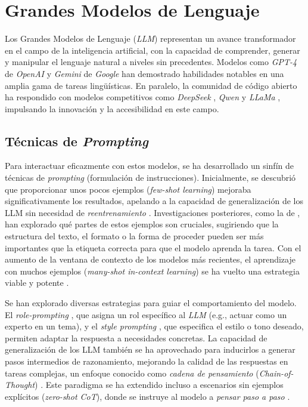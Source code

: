\section{Grandes Modelos de Lenguaje}
\label{sec:llm}
Los Grandes Modelos de Lenguaje (\textit{LLM}) representan un avance transformador en el campo de la inteligencia artificial, con la capacidad de comprender, generar y manipular el lenguaje natural a niveles sin precedentes. Modelos como \textit{GPT-4} de \textit{OpenAI} \parencite{openaiGPT4TechnicalReport2024} y \textit{Gemini} de \textit{Google} \parencite{teamGeminiFamilyHighly2024} han demostrado habilidades notables en una amplia gama de tareas lingüísticas. En paralelo, la comunidad de código abierto ha respondido con modelos competitivos como \textit{DeepSeek} \parencite{deepseek-aiDeepSeekV3TechnicalReport2024}, \textit{Qwen} \parencite{baiQwenTechnicalReport2023} y \textit{LLaMa} \parencite{grattafioriLlama3Herd2024}, impulsando la innovación y la accesibilidad en este campo.

\subsection{Técnicas de \textit{Prompting}}
\label{subsec:prompting_techniques}
Para interactuar eficazmente con estos modelos, se ha desarrollado un sinfín de técnicas de \textit{prompting} (formulación de instrucciones). Inicialmente, se descubrió que proporcionar unos pocos ejemplos (\textit{few-shot learning}) mejoraba significativamente los resultados, apelando a la capacidad de generalización de los LLM sin necesidad de \textit{reentrenamiento} \parencite{brownLanguageModelsAre2020}. Investigaciones posteriores, como la de \cite{minRethinkingRoleDemonstrations2022}, han explorado qué partes de estos ejemplos son cruciales, sugiriendo que la estructura del texto, el formato o la forma de proceder pueden ser más importantes que la etiqueta correcta para que el modelo aprenda la tarea. Con el aumento de la ventana de contexto de los modelos más recientes, el aprendizaje con muchos ejemplos (\textit{many-shot in-context learning}) se ha vuelto una estrategia viable y potente \parencite{agarwalManyShotInContextLearning2024}.

Se han explorado diversas estrategias para guiar el comportamiento del modelo. El \textit{role-prompting} \parencite{kongBetterZeroShotReasoning2024}, que asigna un rol específico al \textit{LLM} (e.g., actuar como un experto en un tema), y el \textit{style prompting} \parencite{luBoundingCapabilitiesLarge2023}, que especifica el estilo o tono deseado, permiten adaptar la respuesta a necesidades concretas. La capacidad de generalización de los LLM también se ha aprovechado para inducirlos a generar pasos intermedios de razonamiento, mejorando la calidad de las respuestas en tareas complejas, un enfoque conocido como \textit{cadena de pensamiento} (\textit{Chain-of-Thought}) \parencite{nyeShowYourWork2021, weiChainofThoughtPromptingElicits2023}. Este paradigma se ha extendido incluso a escenarios sin ejemplos explícitos (\textit{zero-shot CoT}), donde se instruye al modelo a \textit{pensar paso a paso} \parencite{kojimaLargeLanguageModels2023, wangPlanandSolvePromptingImproving2023}.

